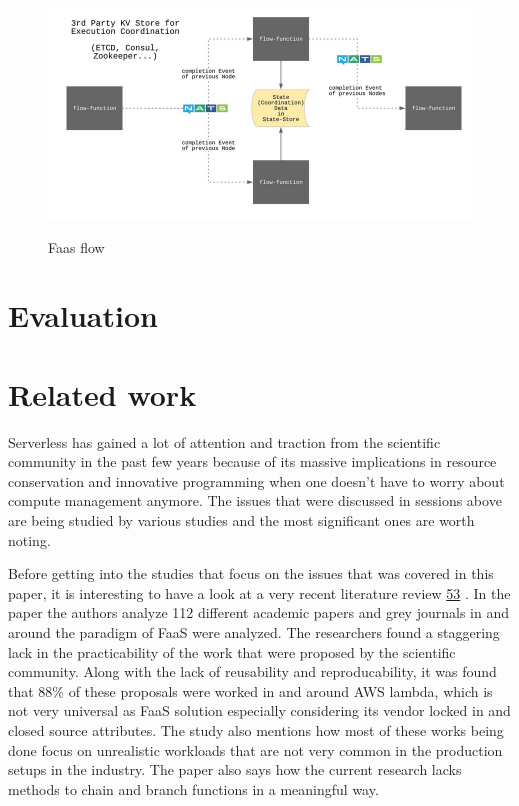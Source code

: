 \documentclass[12pt,titlepage]{article}
\begin{document}
\begin{figure}[!h]
    \caption{Faas flow}
    \centering
    \includegraphics[width=130mm]{./thesis_images/faas-flow.png}
    \label{fig:faas-flow}
\end{figure}
\section{Evaluation}
\label{sec:org76d2155}
\section{Related work}
\label{sec:org5d850a2}
Serverless has gained a lot of attention and traction from the scientific
community in the past few years because of its massive implications in resource
conservation and innovative programming when one doesn't have to worry about
compute management anymore. The issues that were discussed in sessions above are
being studied by various studies and the most significant ones are worth noting.

Before getting into the studies that focus on the issues that was covered in
this paper, it is interesting to have a look at  a very recent literature review \hyperref[ref:53]{53}
. In the paper the authors analyze 112 different academic papers
and grey journals in
and around the paradigm of FaaS were analyzed. The researchers found a
staggering lack in the practicability of the work that were proposed by the
scientific community. Along with the lack of reusability and reproducability, it
was found that 88\% of these proposals were worked in and around AWS lambda,
which is not very universal as FaaS solution especially considering its vendor
locked in and closed source attributes. The study also mentions how most of
these works being done focus on unrealistic workloads that are not very common
in the production setups in the industry. The paper also says how the current
research lacks methods to chain and branch functions in a meaningful way.
\end{document}
